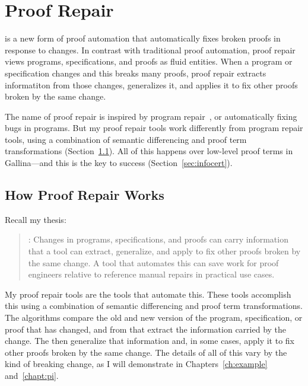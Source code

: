\section{Proof Repair}
\label{sec:mot-rep}

 is a new form of proof automation that automatically fixes broken proofs in response to changes.
In contrast with traditional proof automation, proof repair views programs, specifications, and proofs as fluid entities.
When a program or specification changes and this breaks many proofs, proof repair extracts informatiton from those
changes, generalizes it, and applies it to fix other proofs broken by the same change.

The name of proof repair is inspired by program repair~\cite{Monperrus:2018:ASR:3177787.3105906, Gazzola:2018:ASR:3180155.3182526},
or automatically fixing bugs in programs.
But my proof repair tools work differently from program repair tools, 
using a combination of semantic differencing and proof term transformations (Section~\ref{sec:how}).
All of this happens over low-level proof terms in Gallina---and this is the key to success (Section~\ref{sec:infocert}).

\subsection{How Proof Repair Works}
\label{sec:how}

Recall my thesis:

\begin{quote}
\textbf{}: Changes in programs, specifications, and proofs can carry information that a tool can extract, generalize, and apply to fix other proofs broken by the same change. A tool that automates this can save work for proof engineers relative to reference manual repairs in practical use cases.
\end{quote}
My proof repair tools are the tools that automate this.
These tools accomplish this using a combination of semantic differencing and proof term transformations.
The  algorithms compare the old and new version of the program, specification, or proof that has changed,
and from that extract the information carried by the change.
The  then generalize that information and, in some cases, apply it to fix other proofs broken by the same change.
The details of all of this vary by the kind of breaking change,
as I will demonstrate in Chapters~\ref{ch:example} and~\ref{chapt:pi}.

